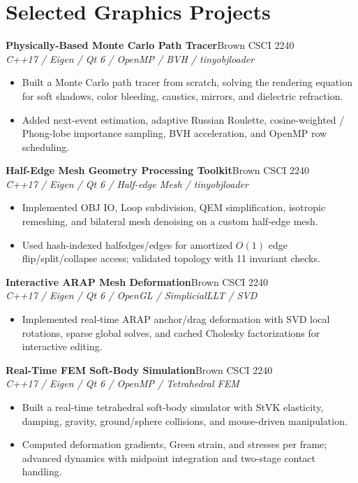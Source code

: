 \documentclass[10pt]{article}
\newcommand{\project}[3]{\vspace{0.18em}\textbf{#1}\hfill #2\\\textit{#3}\vspace{0.04em}}
\begin{document}
\section*{Selected Graphics Projects}
\project{Physically-Based Monte Carlo Path Tracer}{Brown CSCI 2240}{C++17 / Eigen / Qt 6 / OpenMP / BVH / tinyobjloader}
\begin{itemize}
  \item Built a Monte Carlo path tracer from scratch, solving the rendering equation for soft shadows, color bleeding, caustics, mirrors, and dielectric refraction.
  \item Added next-event estimation, adaptive Russian Roulette, cosine-weighted / Phong-lobe importance sampling, BVH acceleration, and OpenMP row scheduling.
\end{itemize}

\project{Half-Edge Mesh Geometry Processing Toolkit}{Brown CSCI 2240}{C++17 / Eigen / Qt 6 / Half-edge Mesh / tinyobjloader}
\begin{itemize}
  \item Implemented OBJ IO, Loop subdivision, QEM simplification, isotropic remeshing, and bilateral mesh denoising on a custom half-edge mesh.
  \item Used hash-indexed halfedges/edges for amortized $O(1)$ edge flip/split/collapse access; validated topology with 11 invariant checks.
\end{itemize}

\project{Interactive ARAP Mesh Deformation}{Brown CSCI 2240}{C++17 / Eigen / Qt 6 / OpenGL / SimplicialLLT / SVD}
\begin{itemize}
  \item Implemented real-time ARAP anchor/drag deformation with SVD local rotations, sparse global solves, and cached Cholesky factorizations for interactive editing.
\end{itemize}

\project{Real-Time FEM Soft-Body Simulation}{Brown CSCI 2240}{C++17 / Eigen / Qt 6 / OpenMP / Tetrahedral FEM}
\begin{itemize}
  \item Built a real-time tetrahedral soft-body simulator with StVK elasticity, damping, gravity, ground/sphere collisions, and mouse-driven manipulation.
  \item Computed deformation gradients, Green strain, and stresses per frame; advanced dynamics with midpoint integration and two-stage contact handling.
\end{itemize}
\end{document}
